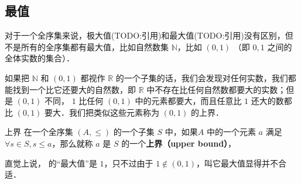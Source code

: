 

\subsection{最值}


对于一个全序集来说，极大值(TODO:引用)和最大值(TODO:引用)没有区别，但不是所有的全序集都有最大值，比如自然数集 $\mathbb{N}$，比如 $(0, 1)$ （即 $0, 1$ 之间的全体实数的集合）．

如果把 $\mathbb{N}$ 和 $(0, 1)$ 都视作 $\mathbb{R}$ 的一个子集的话，我们会发现对任何实数，我们都能找到一个比它还要大的自然数，即 $\mathbb{R}$ 中不存在比任何自然数都要大的实数；但是 $(0, 1)$ 不同， $1$ 比任何 $(0, 1)$ 中的元素都要大，而且任意比 $1$ 还大的数都比 $(0, 1)$ 要大．我们把类似这些元素称为 $(0, 1)$ 的上界．

\begin{definition}{上界}
在一个全序集 $(A, \leq)$ 的一个子集 $S$ 中，如果$A$ 中的一个元素 $a$ 满足 $\forall s \in S, s \leq a$，那么就称 $a$ 是 $S$ 的一个\textbf{上界（upper bound）}，
\end{definition}


直觉上说， 的“最大值”是 $1$，只不过由于 $1 \not\in (0, 1)$，叫它最大值显得并不合适．